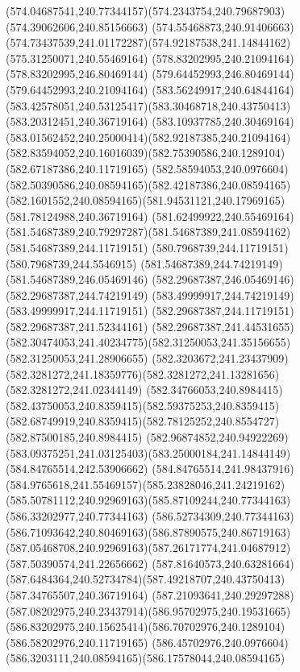 {{	\curveto(574.04687541,240.77344157)(574.2343754,240.79687903)(574.39062606,240.85156663)
	\curveto(574.55468873,240.91406663)(574.73437539,241.01172287)(574.92187538,241.14844162)
	\lineto(575.31250071,240.55469164)
	\closepath
	\moveto(578.83202995,240.21094164)
	\lineto(578.83202995,246.80469144)
	\lineto(579.64452993,246.80469144)
	\lineto(579.64452993,240.21094164)
	\closepath
	\moveto(583.56249917,240.64844164)
	\curveto(583.42578051,240.53125417)(583.30468718,240.43750413)(583.20312451,240.36719164)
	\curveto(583.10937785,240.30469164)(583.01562452,240.25000414)(582.92187385,240.21094164)
	\curveto(582.83594052,240.16016039)(582.75390586,240.1289104)(582.67187386,240.11719165)
	\curveto(582.58594053,240.0976604)(582.50390586,240.08594165)(582.42187386,240.08594165)
	\curveto(582.1601552,240.08594165)(581.94531121,240.17969165)(581.78124988,240.36719164)
	\curveto(581.62499922,240.55469164)(581.54687389,240.79297287)(581.54687389,241.08594162)
	\lineto(581.54687389,244.11719151)
	\lineto(580.7968739,244.11719151)
	\lineto(580.7968739,244.5546915)
	\lineto(581.54687389,244.74219149)
	\lineto(581.54687389,246.05469146)
	\lineto(582.29687387,246.05469146)
	\lineto(582.29687387,244.74219149)
	\lineto(583.49999917,244.74219149)
	\lineto(583.49999917,244.11719151)
	\lineto(582.29687387,244.11719151)
	\lineto(582.29687387,241.52344161)
	\lineto(582.29687387,241.44531655)
	\curveto(582.30474053,241.40234775)(582.31250053,241.35156655)(582.31250053,241.28906655)
	\curveto(582.3203672,241.23437909)(582.3281272,241.18359776)(582.3281272,241.13281656)
	\lineto(582.3281272,241.02344149)
	\curveto(582.34766053,240.8984415)(582.43750053,240.8359415)(582.59375253,240.8359415)
	\curveto(582.68749919,240.8359415)(582.78125252,240.8554727)(582.87500185,240.8984415)
	\curveto(582.96874852,240.94922269)(583.09375251,241.03125403)(583.25000184,241.14844149)
	\closepath
	\moveto(584.84765514,242.53906662)
	\curveto(584.84765514,241.98437916)(584.9765618,241.55469157)(585.23828046,241.24219162)
	\curveto(585.50781112,240.92969163)(585.87109244,240.77344163)(586.33202977,240.77344163)
	\curveto(586.52734309,240.77344163)(586.71093642,240.80469163)(586.87890575,240.86719163)
	\curveto(587.05468708,240.92969163)(587.26171774,241.04687912)(587.50390574,241.22656662)
	\lineto(587.81640573,240.63281664)
	\curveto(587.6484364,240.52734784)(587.49218707,240.43750413)(587.34765507,240.36719164)
	\curveto(587.21093641,240.29297288)(587.08202975,240.23437914)(586.95702975,240.19531665)
	\curveto(586.83202975,240.15625414)(586.70702976,240.1289104)(586.58202976,240.11719165)
	\curveto(586.45702976,240.0976604)(586.3203111,240.08594165)(586.17578044,240.08594165)
}}
